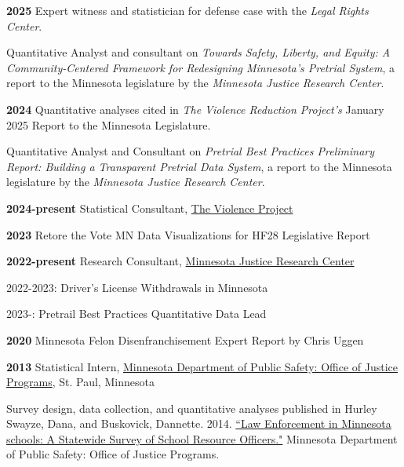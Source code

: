 \documentclass[letterpaper]{article}
\newenvironment{publist}{%
  \begin{list}{}{%
    \setlength{\leftmargin}{0cm}   %
    \setlength{\labelwidth}{2cm}     %
    \setlength{\labelsep}{0.5cm}     %
  }%
}{%
  \end{list}%
}
\renewenvironment{itemize}{
  \begin{list}{}{
    \setlength{\leftmargin}{1.5em}
  }
}{
  \end{list}
}
\begin{document}
\begin{publist}

\item[\textbf{2025}] Expert witness and statistician for defense case with the \textit{Legal Rights Center}.
\item Quantitative Analyst and consultant on \textit{Towards Safety, Liberty, and Equity: A Community-Centered Framework for Redesigning Minnesota's Pretrial System}, a report to the Minnesota legislature by the \textit{Minnesota Justice Research Center}. 
\item[\textbf{2024}] Quantitative analyses cited in \textit{The Violence Reduction Project's} January 2025 Report to the Minnesota Legislature.  
\item Quantitative Analyst and Consultant on \textit{Pretrial Best Practices Preliminary Report: Building a Transparent Pretrial Data System}, a report to the Minnesota legislature by the \textit{Minnesota Justice Research Center}.
\item[\textbf{2024-present}] Statistical Consultant, \href{https://www.theviolenceproject.org/}{The Violence Project}
\item[\textbf{2023}] Retore the Vote MN Data Visualizations for HF28 Legislative Report
\item[\textbf{2022-present}] Research Consultant, \href{https://www.mnjrc.org/about-us}{Minnesota Justice Research Center}

\begin{itemize}

\item 2022-2023: Driver's License Withdrawals in Minnesota
\item 2023-: Pretrail Best Practices Quantitative Data Lead

\end{itemize}

\item[\textbf{2020}] Minnesota Felon Disenfranchisement Expert Report by Chris Uggen 

\item[\textbf{2013}] Statistical Intern, \href{https://dps.mn.gov/divisions/ojp/statistical-analysis-center/Pages/default.aspx}{Minnesota Department of Public Safety: Office of Justice Programs}, St. Paul, Minnesota
\begin{itemize}
	\item Survey design, data collection, and quantitative analyses published in Hurley Swayze, Dana, and  Buskovick, Dannette. 2014. \href{https://dps.mn.gov/divisions/ojp/forms-documents/Documents/SRO20REPORT.pdf}{``Law Enforcement in Minnesota schools: A Statewide Survey of School Resource Officers."} Minnesota Department of Public Safety: Office of Justice Programs.
\end{itemize}

\end{publist}
\end{document}
